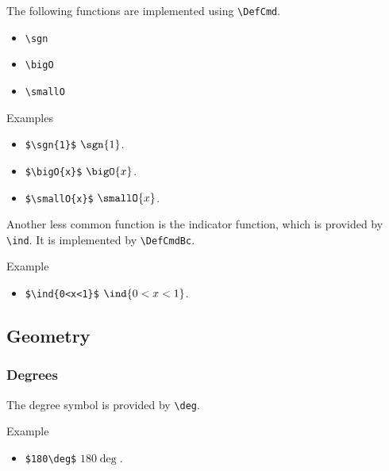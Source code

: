 The following functions are implemented using \verb|\DefCmd|.

\begin{multicols}{3}
    \begin{itemize}
        \item \verb|\sgn|
        \item \verb|\bigO|
        \item \verb|\smallO|
    \end{itemize}
\end{multicols}

\begin{myframe}{Examples}
    \begin{itemize}
        \item \verb|$\sgn{1}$| \produces{} $\sgn{1}$.
        \item \verb|$\bigO{x}$| \produces{} $\bigO{x}$.
        \item \verb|$\smallO{x}$| \produces{} $\smallO{x}$.
    \end{itemize}
\end{myframe}

Another less common function is the indicator function, which is provided by \verb|\ind|. It is implemented by \verb|\DefCmdBc|.

\begin{myframe}{Example }
    \begin{itemize}
        \item \verb|$\ind{0<x<1}$| \produces{} $\ind{0<x<1}$.
    \end{itemize}
\end{myframe}

\subsection{Geometry}

\subsubsection{Degrees}

The degree symbol is provided by \verb|\deg|.

\begin{myframe}{Example }
    \begin{itemize}
        \item \verb|$180\deg$| \produces{} $180\deg$.
    \end{itemize}
\end{myframe}


